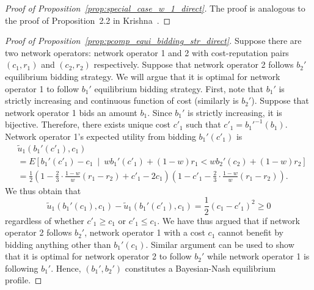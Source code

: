 \begin{proof}[Proof of Proposition~\ref{prop:special_case_w_1_direct}]
The proof is analogous to the proof of Proposition~2.2 in Krishna~\cite{Krishna10}.
\end{proof}

\begin{proof}[Proof of Proposition~\ref{prop:pcomp_equi_bidding_str_direct}]
Suppose there are two network operators: network operator 1 and 2 with cost-reputation pairs $(c_1,r_1)$ and $(c_2,r_2)$ respectively. Suppose that network operator 2 follows $b_2'$ equilibrium bidding strategy. We will argue that it is optimal for network operator 1 to follow $b_1'$ equilibrium bidding strategy. First, note that $b_1'$ is strictly increasing and continuous function of cost (similarly is $b_2'$). Suppose that network operator 1 bids an amount $b_1$. Since $b_1'$ is strictly increasing, it is bijective. Therefore, there exists unique cost $c'_1$ such that $c'_1 = {b_1'}^{-1}(b_1)$. Network operator 1's expected utility from bidding $b_1'(c'_1)$ is
\begin{align*}
	&\tilde{u}_1(b_1'(c'_1), c_1) \\
	&= E \left[ b_1'(c'_1) - c_1 \:\middle\vert\: wb_1'(c'_1) + (1-w)r_1 < wb_2'(c_2) + (1-w)r_2 \right] \\
	&= \frac{1}{2} \left( 1 - \frac{2}{3}\cdot\frac{1-w}{w}(r_1-r_2) + c'_1 - 2c_1 \right) \left( 1 - c'_1 - \frac{2}{3}\cdot\frac{1-w}{w}(r_1-r_2) \right).
\end{align*}
We thus obtain that
\begin{equation*}
	\tilde{u}_1(b_1'(c_1), c_1) - \tilde{u}_1(b_1'(c'_1), c_1) = \frac{1}{2}(c_1-c'_1)^2 \ge 0
\end{equation*}
regardless of whether $c'_1\ge c_1$ or $c'_1 \le c_1$. We have thus argued that if network operator 2 follows $b_2'$, network operator 1 with a cost $c_1$ cannot benefit by bidding anything other than $b_1'(c_1)$. Similar argument can be used to show that it is optimal for network operator 2 to follow $b_2'$ while network operator 1 is following $b_1'$. Hence, $(b_1',b_2')$ constitutes a Bayesian-Nash equilibrium profile.
\end{proof}

